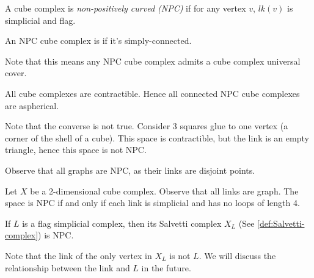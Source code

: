\begin{definition}
    \label{def:NPC-cube-complex}
    A cube complex is \emph{non-positively curved (NPC)} if for any vertex \(v\), \(lk(v)\) is simplicial and flag.
\end{definition}

\begin{definition}
    \label{def:CAT-0-cube-complex}
    An NPC cube complex is \emph{\CATz} if it's simply-connected.
\end{definition}

Note that this means any NPC cube complex admits a \CATz cube complex universal cover.

\begin{theorem}[Gromov]
    \label{thm:connected-NPC-cube-complex-aspherical}
    All \CATz cube complexes are contractible. Hence all connected NPC cube complexes are aspherical.
\end{theorem}

Note that the converse is not true. Consider 3 squares glue to one vertex (a corner of the shell of a cube). This space is contractible, but the link is an empty triangle, hence this space is not NPC.

Observe that all graphs are NPC, as their links are disjoint points.

\begin{proposition}
    \label{prop:NPC-criterion-of-2-dim-cube-complex}
    Let \(X\) be a 2-dimensional cube complex. Observe that  all links are graph. The space is NPC if and only if each link is simplicial and has no loops of length 4.
\end{proposition}

\begin{lemma}
    \label{lem:flag-simplicial-complex-NPC-Salvetti-complex}
    If \(L\) is a flag simplicial complex, then its Salvetti complex \(X_L\) (See \cref{def:Salvetti-complex}) is NPC.
\end{lemma}

Note that the link of the only vertex in \(X_L\) is not \(L\). We will discuss the relationship between the link and \(L\) in the future.

